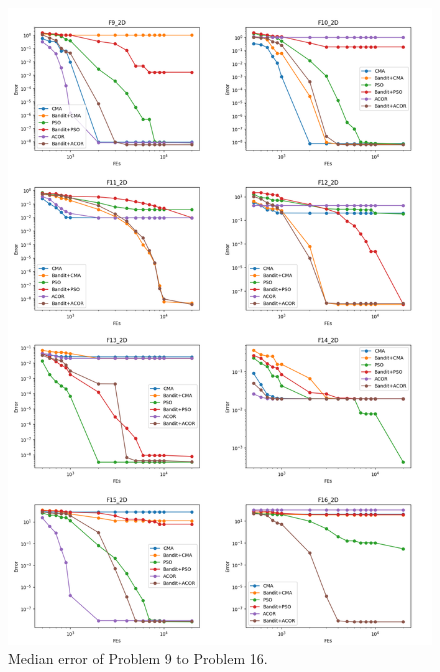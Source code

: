 \begin{figure}
\centering
\includegraphics[width=\textwidth]{Median_F9_F16}
\caption{Median error of Problem 9 to Problem 16.}\label{fig:Median_F9_F16}
\end{figure}


